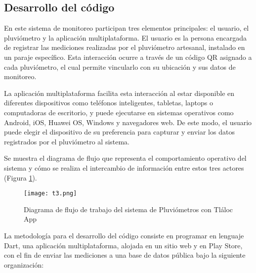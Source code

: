 \subsection{Desarrollo del código}
En este sistema de monitoreo participan tres elementos principales: el usuario, el pluviómetro y la aplicación multiplataforma. El usuario es la persona encargada de registrar las mediciones realizadas por el pluviómetro artesanal, instalado en un paraje específico. Esta interacción ocurre a través de un código QR asignado a cada pluviómetro, el cual permite vincularlo con su ubicación y sus datos de monitoreo.

La aplicación multiplataforma facilita esta interacción al estar disponible en diferentes dispositivos como teléfonos inteligentes, tabletas, laptops o computadoras de escritorio, y puede ejecutarse en sistemas operativos como Android, iOS, Huawei OS, Windows y navegadores web. De este modo, el usuario puede elegir el dispositivo de su preferencia para capturar y enviar los datos registrados por el pluviómetro al sistema.

Se muestra el diagrama de flujo que representa el comportamiento operativo del sistema y cómo se realiza el intercambio de información entre estos tres actores (Figura \ref{t3}).
\begin{figure}[h!]
\centering
  \texttt{[image: t3.png]}
  \caption{Diagrama de flujo de trabajo del sistema de Pluviómetros con Tláloc App}
  \label{t3}
\end{figure}

La metodología para el desarrollo del código consiste en programar en lenguaje Dart, una aplicación multiplataforma, alojada en un sitio web y en Play Store, con el fin de enviar las mediciones a una base de datos pública bajo la siguiente organización:


